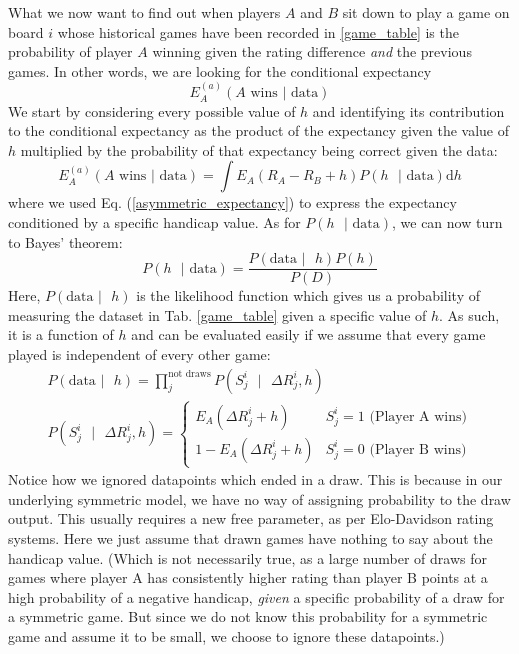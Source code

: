 \documentclass[12pt]{article}
\begin{document}
	What we now want to find out when players $A$ and $B$ sit down to play a game on board $i$ whose historical games have been recorded in \ref{game_table} is the probability of player $A$ winning given the rating difference \textit{and} the previous games. In other words, we are looking for the conditional expectancy
	$$E^{(a)}_A(A\text{ wins } | \text{ data})$$
	We start by considering every possible value of $h$ and identifying its contribution to the conditional expectancy as the product of the expectancy given the value of $h$ multiplied by the probability of that expectancy being correct given the data:
	\begin{equation}
	E^{(a)}_A(A\text{ wins } | \text{ data}) = \int E_A(R_A - R_B + h) P(h\text{ } | \text{ data}) \text{d}h
	\end{equation}
	where we used Eq. (\ref{asymmetric_expectancy}) to express the expectancy conditioned by a specific handicap value. As for $P(h\text{ } | \text{ data})$, we can now turn to Bayes' theorem:
	\begin{equation} \label{bayes}
	P(h\text{ } | \text{ data}) = \frac{P(\text{data } | \text{ }h)P(h)}{P(D)}
	\end{equation}
	Here, $P(\text{data } | \text{ }h)$ is the likelihood function which gives us a probability of measuring the dataset in Tab. \ref{game_table} given a specific value of $h$. As such, it is a function of $h$ and can be evaluated easily if we assume that every game played is independent of every other game:
	\begin{eqnarray} \label{handicap_likelihood}
	P(\text{data } | \text{ }h) = \prod_j^{\text{not draws}} P(S^i_j\text{ }|\text{ }\Delta R^i_j, h)\\
	P(S^i_j\text{ }|\text{ }\Delta R^i_j, h)=\begin{cases} 
      E_A(\Delta R^i_j + h) & S^i_j = 1\text{ (Player A wins)} \\
      1 - E_A(\Delta R^i_j + h) & S^i_j = 0\text{ (Player B wins)}
   \end{cases}
	\end{eqnarray}
	Notice how we ignored datapoints which ended in a draw. This is because in our underlying symmetric model, we have no way of assigning probability to the draw output. This usually requires a new free parameter, as per Elo-Davidson rating systems. Here we just assume that drawn games have nothing to say about the handicap value. (Which is not necessarily true, as a large number of draws for games where player A has consistently higher rating than player B points at a high probability of a negative handicap, \textit{given} a specific probability of a draw for a symmetric game. But since we do not know this probability for a symmetric game and assume it to be small, we choose to ignore these datapoints.)
	
\end{document}
